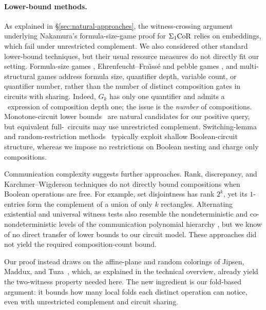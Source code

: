 \paragraph{Lower-bound methods.}
As explained in \S\ref{sec:natural-approaches}, the witness-crossing
argument underlying Nakamura's formula-size-game proof for $\Sigma_1\mathrm{CoR}$
\citep{adler-immerman2003,nakamura2022} relies on embeddings, which fail
under unrestricted complement. We also considered other standard
lower-bound techniques, but their usual resource measures do not directly
fit our setting. Formula-size games
\citep{grohe-schweikardt2005,french2013,hella-vilander2019},
Ehrenfeucht--Fra\"{\i}ss\'e and pebble games
\citep{fraisse1954classif,ehrenfeucht1961,immerman1982,libkin2004},
and multi-structural games
\citep{immerman1981,fagin2021,carmosino2024} address formula size,
quantifier depth, variable count, or quantifier number, rather than the
number of distinct composition gates in circuits with sharing. Indeed,
$G_k$ has only one quantifier and admits a \CoR\ expression of
composition depth one; the issue is the \emph{number} of compositions.
Monotone-circuit lower bounds~\citep{razborov1985,alon-boppana1987}
are natural candidates for our positive query, but equivalent full-\CoR\
circuits may use unrestricted complement. Switching-lemma and
random-restriction methods~\citep{hastad1986} typically exploit
shallow Boolean-circuit structure, whereas we impose no restrictions on
Boolean nesting and charge only compositions.

Communication complexity suggests further approaches. Rank,
discrepancy, and Karchmer--Wigderson techniques
\citep{mehlhorn-schmidt1982,kushilevitz-nisan1997,karchmer-wigderson1990,jukna2012}
do not directly bound compositions when Boolean operations are free.
For example, set disjointness has rank $2^k$, yet its $1$-entries form
the complement of a union of only $k$ rectangles. Alternating existential
and universal witness tests also resemble the nondeterministic and
co-nondeterministic levels of the communication polynomial hierarchy
\citep{babai-frankl-simon1986,goos-pitassi-watson2018}, but we know of
no direct transfer of lower bounds to our circuit model. These approaches did not yield the required composition-count bound.

Our proof instead draws on the affine-plane and random colorings of
Jipsen, Maddux, and Tuza~\citep{jipsen-maddux-tuza1995}, which, as
explained in the technical overview, already yield the two-witness
property needed here. The new ingredient is our fold-based argument:
it bounds how many local folds each distinct operation can notice,
even with unrestricted complement and circuit sharing.
